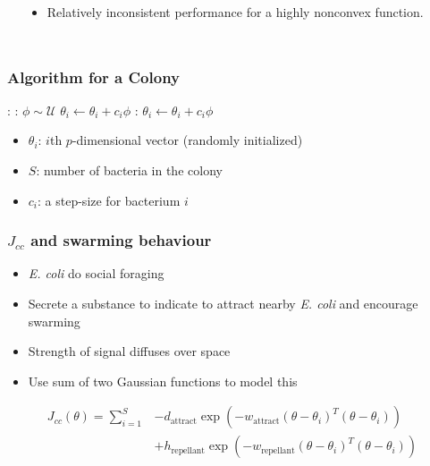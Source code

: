 \documentclass{beamer}
\begin{document}
\begin{frame}
\begin{columns}
\begin{center}
    \end{center}
    \begin{itemize}
      \item Relatively inconsistent performance for a highly nonconvex function.
    \end{itemize}
\end{columns}
\end{frame}

\begin{frame}
\frametitle{Algorithm for a Colony}
\begin{algorithmic}[1]
:
  :
    \State $\phi \sim \mathcal{U}$
    \State $\theta_i \gets \theta_i + c_i \phi$
    :
      \State $\theta_i \gets \theta_i + c_i \phi$
    \EndWhile
  \EndFor
\EndFor
\end{algorithmic}
\begin{itemize}
  \item $\theta_i$: $i$th $p$-dimensional vector (randomly initialized)
  \item $S$: number of bacteria in the colony
  \item $c_i$: a step-size for bacterium $i$
\end{itemize}
\end{frame}

\begin{frame}
\frametitle{$J_{cc}$ and swarming behaviour}
\begin{itemize}
  \item \textit{\textit{E. coli}} do social foraging
  \item Secrete a substance to indicate to attract nearby \textit{\textit{E. coli}} and encourage swarming
  \item Strength of signal diffuses over space
  \item Use sum of two Gaussian functions to model this
\end{itemize}
\begin{align*}
J_{cc}(\theta) = \sum_{i=1}^S &-d_\text{attract} \exp \left( -w_\text{attract} (\theta - \theta_i)^T (\theta - \theta_i) \right) \\ &+ h_\text{repellant} \exp \left( -w_\text{repellant} (\theta - \theta_i)^T (\theta - \theta_i) \right)
\end{align*}
\end{frame}
\end{document}
